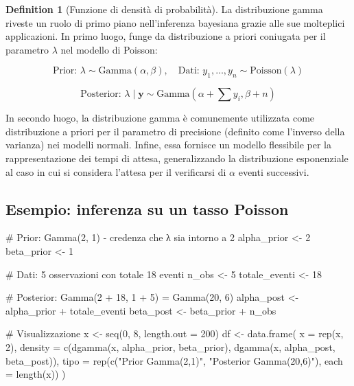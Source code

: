 \documentclass[
  letterpaper,
  DIV=11,
  numbers=noendperiod,
  oneside]{scrreprt}
\newenvironment{Shaded}{\begin{snugshade}}{\end{snugshade}}
\newcommand{\AttributeTok}[1]{\textcolor[rgb]{0.40,0.45,0.13}{#1}}
\newcommand{\CommentTok}[1]{\textcolor[rgb]{0.37,0.37,0.37}{#1}}
\newcommand{\DecValTok}[1]{\textcolor[rgb]{0.68,0.00,0.00}{#1}}
\newcommand{\FunctionTok}[1]{\textcolor[rgb]{0.28,0.35,0.67}{#1}}
\newcommand{\NormalTok}[1]{\textcolor[rgb]{0.00,0.23,0.31}{#1}}
\newcommand{\OtherTok}[1]{\textcolor[rgb]{0.00,0.23,0.31}{#1}}
\newcommand{\SpecialCharTok}[1]{\textcolor[rgb]{0.37,0.37,0.37}{#1}}
\newcommand{\StringTok}[1]{\textcolor[rgb]{0.13,0.47,0.30}{#1}}
\theoremstyle{definition}
\theoremstyle{plain}
\theoremstyle{definition}
\newtheorem{definition}{Definition}[chapter]
\theoremstyle{remark}
\begin{document}
\begin{definition}[Funzione di densità di
probabilità]
La distribuzione gamma riveste un ruolo di primo piano nell'inferenza
bayesiana grazie alle sue molteplici applicazioni. In primo luogo, funge
da distribuzione a priori coniugata per il parametro \(\lambda\) nel
modello di Poisson:

\[
\text{Prior: } \lambda \sim \text{Gamma}(\alpha, \beta), \quad \text{Dati: } y_1, \ldots, y_n \sim \text{Poisson}(\lambda)
\]

\[
\text{Posterior: } \lambda \mid \mathbf{y} \sim \text{Gamma}\left(\alpha + \sum y_i, \beta + n\right)
\]

In secondo luogo, la distribuzione gamma è comunemente utilizzata come
distribuzione a priori per il parametro di precisione (definito come
l'inverso della varianza) nei modelli normali. Infine, essa fornisce un
modello flessibile per la rappresentazione dei tempi di attesa,
generalizzando la distribuzione esponenziale al caso in cui si considera
l'attesa per il verificarsi di \(\alpha\) eventi successivi.

\subsection{Esempio: inferenza su un tasso
Poisson}\label{esempio-inferenza-su-un-tasso-poisson}

\begin{Shaded}
\begin{Highlighting}[]
\CommentTok{\# Prior: Gamma(2, 1) {-} credenza che λ sia intorno a 2}
\NormalTok{alpha\_prior }\OtherTok{\textless{}{-}} \DecValTok{2}
\NormalTok{beta\_prior }\OtherTok{\textless{}{-}} \DecValTok{1}

\CommentTok{\# Dati: 5 osservazioni con totale 18 eventi}
\NormalTok{n\_obs }\OtherTok{\textless{}{-}} \DecValTok{5}
\NormalTok{totale\_eventi }\OtherTok{\textless{}{-}} \DecValTok{18}

\CommentTok{\# Posterior: Gamma(2 + 18, 1 + 5) = Gamma(20, 6)}
\NormalTok{alpha\_post }\OtherTok{\textless{}{-}}\NormalTok{ alpha\_prior }\SpecialCharTok{+}\NormalTok{ totale\_eventi}
\NormalTok{beta\_post }\OtherTok{\textless{}{-}}\NormalTok{ beta\_prior }\SpecialCharTok{+}\NormalTok{ n\_obs}

\CommentTok{\# Visualizzazione}
\NormalTok{x }\OtherTok{\textless{}{-}} \FunctionTok{seq}\NormalTok{(}\DecValTok{0}\NormalTok{, }\DecValTok{8}\NormalTok{, }\AttributeTok{length.out =} \DecValTok{200}\NormalTok{)}
\NormalTok{df }\OtherTok{\textless{}{-}} \FunctionTok{data.frame}\NormalTok{(}
  \AttributeTok{x =} \FunctionTok{rep}\NormalTok{(x, }\DecValTok{2}\NormalTok{),}
  \AttributeTok{density =} \FunctionTok{c}\NormalTok{(}\FunctionTok{dgamma}\NormalTok{(x, alpha\_prior, beta\_prior), }\FunctionTok{dgamma}\NormalTok{(x, alpha\_post, beta\_post)),}
  \AttributeTok{tipo =} \FunctionTok{rep}\NormalTok{(}\FunctionTok{c}\NormalTok{(}\StringTok{"Prior Gamma(2,1)"}\NormalTok{, }\StringTok{"Posterior Gamma(20,6)"}\NormalTok{), }\AttributeTok{each =} \FunctionTok{length}\NormalTok{(x))}
\NormalTok{)}


\end{Highlighting}
\end{Shaded}
\end{definition}
\end{document}
